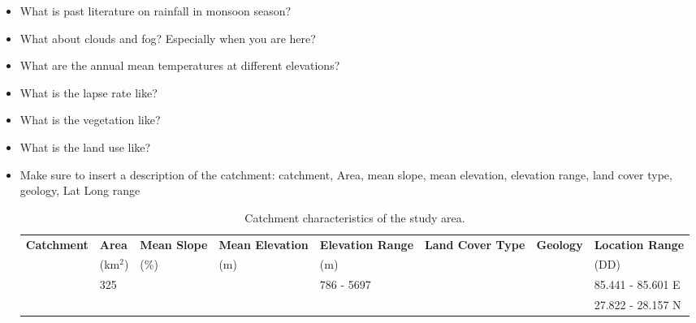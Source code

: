 \begin{itemize}
\item{What is past literature on rainfall in monsoon season?}

\item{What about clouds and fog? Especially when you are here?}

\item{What are the annual mean temperatures at different elevations?}

\item{What is the lapse rate like?}

\item{What is the vegetation like?}

\item{What is the land use like?}

\item{Make sure to insert a description of the catchment: catchment, Area, mean slope, mean elevation, elevation range, land cover type, geology, Lat Long range}

\begin{table}[h!]
\centering
\begin{small}
\begin{tabular}{p{2cm} p{1cm} p{1cm} p{1.8cm} p{1.8cm} p{2cm} p{1.5cm} p{2.8cm}}
\hline
\textbf{Catchment} & \textbf{Area} & \textbf{Mean Slope} & \textbf{\phantom{hi}Mean \phantom{hel} Elevation} & \textbf{\phantom{}Elevation \phantom{hi}Range} & \textbf{Land Cover \phantom{iee}Type} & \textbf{Geology} & \textbf{\phantom{hiidii}Location \phantom{oideo}Range} \\ 
                   & (km\(^2\))    & \phantom{h}(\%)                & \phantom{hdii}(m)                     & \phantom{hifi}(m)                      &                         &                   & \phantom{hiiiiiiiiii}(DD)             \\ \hline
                   &     \phantom{h}325          &                     &                         &    786 - 5697                     &                         &                   &      85.441 - 85.601 E                  \\
                   &               &                     &                         &                          &                         &                   &      27.822 - 28.157 N                 \\ \hline
\end{tabular}
\end{small}
\caption{Catchment characteristics of the study area.}
\label{tab:catchment_characteristics}
\end{table}



\end{itemize}
